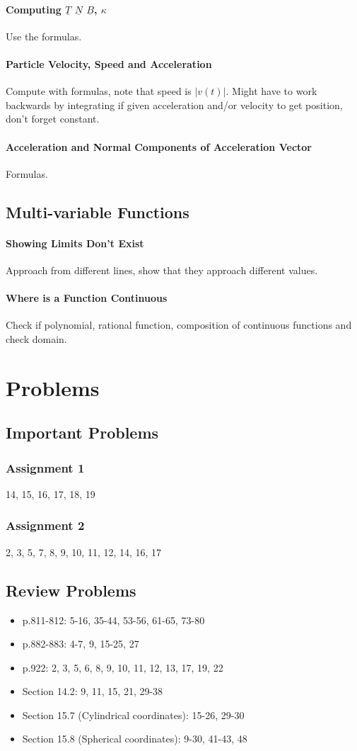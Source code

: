 \documentclass[12 pt]{article}
\theoremstyle{definition}
\begin{document}
\paragraph{Computing $\underline{T}$ $\underline{N}$ $\underline{B}$, $\kappa$} Use the formulas.
\paragraph{Particle Velocity, Speed and Acceleration} Compute with formulas, note that speed is $|v(t)|$. Might have to work backwards by integrating if given acceleration and/or velocity to get position, don't forget constant.
\paragraph{Acceleration and Normal Components of Acceleration Vector} Formulas.
\subsection{Multi-variable Functions}
\paragraph{Showing Limits Don't Exist} Approach from different lines, show that they approach different values.
\paragraph{Where is a Function Continuous} Check if polynomial, rational function, composition of continuous functions and check domain.
\section{Problems}
\subsection{Important Problems}
\subsubsection{Assignment 1} 14, 15, 16, 17, 18, 19
\subsubsection{Assignment 2} 2, 3, 5, 7, 8, 9, 10, 11, 12, 14, 16, 17
\subsection{Review Problems}
\begin{itemize}
	\item p.811-812: 5-16, 35-44, 53-56, 61-65, 73-80
	\item p.882-883: 4-7, 9, 15-25, 27
	\item p.922: 2, 3, 5, 6, 8, 9, 10, 11, 12, 13, 17, 19, 22
	\item Section 14.2: 9, 11, 15, 21, 29-38
        \item Section 15.7 (Cylindrical coordinates): 15-26, 29-30
        \item Section 15.8 (Spherical coordinates): 9-30, 41-43, 48
\end{itemize}
\end{document}
